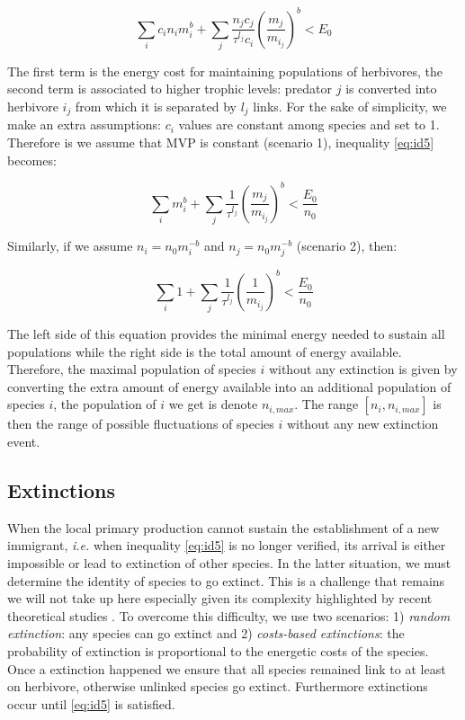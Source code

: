 \begin{equation} \sum_i c_in_im_i^b + \sum_j \frac{n_jc_j}{\tau^{l_j} c_i} \left( \frac{m_j}{m_{i_j}} \right)^b < E_0 \label{eq:id5}\end{equation}

The first term is the energy cost for maintaining populations of
herbivores, the second term is associated to higher trophic levels:
predator \(j\) is converted into herbivore \(i_j\) from which it is
separated by \(l_j\) links. For the sake of simplicity, we make an extra
assumptions: \(c_i\) values are constant among species and set to 1.
Therefore is we assume that MVP is constant (scenario 1), inequality
\ref{eq:id5} becomes:

\begin{equation} \sum_i m_i^b + \sum_j \frac{1}{\tau^{l_j}} \left( \frac{m_j}{m_{i_j}} \right)^b< \frac{E_0}{n_0} \label{eq:id5a}\end{equation}

Similarly, if we assume \(n_i=n_0m_i^{-b}\) and \(n_j=n_0m_j^{-b}\)
(scenario 2), then:

\begin{equation} \sum_i 1 + \sum_j \frac{1}{\tau^{l_j}} \left( \frac{1}{m_{i_j}} \right)^b< \frac{E_0}{n_0} \label{eq:id5b}\end{equation}

The left side of this equation provides the minimal energy needed to
sustain all populations while the right side is the total amount of
energy available. Therefore, the maximal population of species \(i\)
without any extinction is given by converting the extra amount of energy
available into an additional population of species \(i\), the population
of \(i\) we get is denote \(n_{i,max}\). The range \([n_i, n_{i, max}]\)
is then the range of possible fluctuations of species \(i\) without any
new extinction event.

\subsection{Extinctions}\label{extinctions}

When the local primary production cannot sustain the establishment of a
new immigrant, \emph{i.e.} when inequality \ref{eq:id5} is no longer
verified, its arrival is either impossible or lead to extinction of
other species. In the latter situation, we must determine the identity
of species to go extinct. This is a challenge that remains we will not
take up here especially given its complexity highlighted by recent
theoretical studies \citep{Saterberg2013, Zhao2016}. To overcome this
difficulty, we use two scenarios: 1) \emph{random extinction}: any
species can go extinct and 2) \emph{costs-based extinctions}: the
probability of extinction is proportional to the energetic costs of the
species. Once a extinction happened we ensure that all species remained
link to at least on herbivore, otherwise unlinked species go extinct.
Furthermore extinctions occur until \ref{eq:id5} is satisfied.

